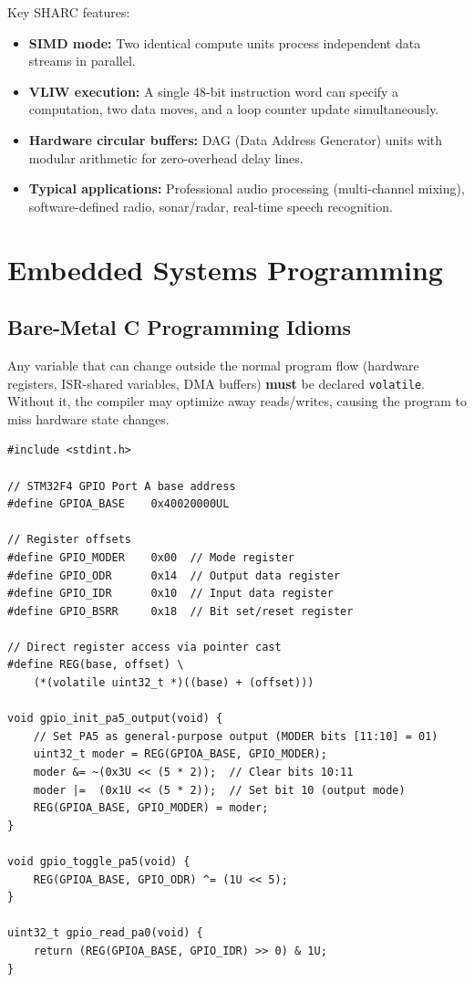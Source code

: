 Key SHARC features:
\begin{itemize}
  \item \textbf{SIMD mode:} Two identical compute units process independent data streams in parallel.
  \item \textbf{VLIW execution:} A single 48-bit instruction word can specify a computation, two data moves, and a loop counter update simultaneously.
  \item \textbf{Hardware circular buffers:} DAG (Data Address Generator) units with modular arithmetic for zero-overhead delay lines.
  \item \textbf{Typical applications:} Professional audio processing (multi-channel mixing), software-defined radio, sonar/radar, real-time speech recognition.
\end{itemize}

\section{Embedded Systems Programming}
\label{sec:proc:programming}

\subsection{Bare-Metal C Programming Idioms}

\begin{important}
Any variable that can change outside the normal program flow (hardware registers, ISR-shared variables, DMA buffers) \textbf{must} be declared \texttt{volatile}. Without it, the compiler may optimize away reads/writes, causing the program to miss hardware state changes.
\end{important}

\begin{lstlisting}[style=C, caption={Memory-mapped I/O: direct register access for STM32 GPIO.}]
#include <stdint.h>

// STM32F4 GPIO Port A base address
#define GPIOA_BASE    0x40020000UL

// Register offsets
#define GPIO_MODER    0x00  // Mode register
#define GPIO_ODR      0x14  // Output data register
#define GPIO_IDR      0x10  // Input data register
#define GPIO_BSRR     0x18  // Bit set/reset register

// Direct register access via pointer cast
#define REG(base, offset) \
    (*(volatile uint32_t *)((base) + (offset)))

void gpio_init_pa5_output(void) {
    // Set PA5 as general-purpose output (MODER bits [11:10] = 01)
    uint32_t moder = REG(GPIOA_BASE, GPIO_MODER);
    moder &= ~(0x3U << (5 * 2));  // Clear bits 10:11
    moder |=  (0x1U << (5 * 2));  // Set bit 10 (output mode)
    REG(GPIOA_BASE, GPIO_MODER) = moder;
}

void gpio_toggle_pa5(void) {
    REG(GPIOA_BASE, GPIO_ODR) ^= (1U << 5);
}

uint32_t gpio_read_pa0(void) {
    return (REG(GPIOA_BASE, GPIO_IDR) >> 0) & 1U;
}
\end{lstlisting}

